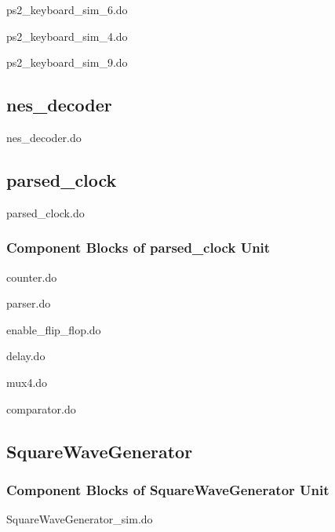\documentclass[a4paper]{article}
\begin{document}
ps2\_keyboard\_sim\_6.do


ps2\_keyboard\_sim\_4.do


ps2\_keyboard\_sim\_9.do


\clearpage

\subsection{nes\_decoder}
nes\_decoder.do


\subsection{parsed\_clock}
parsed\_clock.do


\subsubsection{Component Blocks of parsed\_clock Unit}
counter.do


parser.do


enable\_flip\_flop.do


delay.do


mux4.do


comparator.do


\clearpage

\subsection{SquareWaveGenerator}
\subsubsection{Component Blocks of SquareWaveGenerator Unit}
SquareWaveGenerator\_sim.do

\end{document}
